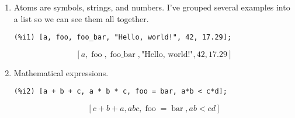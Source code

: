 \documentclass[12pt,leqno]{article}
\begin{document}
\begin{enumerate}

\item Atoms are symbols, strings, and numbers.
I've grouped several examples into a list so we can see them all together.
\begin{verbatim}
(%i1) [a, foo, foo_bar, "Hello, world!", 42, 17.29];
\end{verbatim}
\begin{dmath}[number={\(\mathop{\mathrm{\%o}_{1}}\)}]
\left[a, \mathop{\mathrm{foo}}, \mathop{\mathrm{foo\_bar}}, \mbox{"Hello, world!"}, 42, 17.29\right]
\end{dmath}

\item Mathematical expressions.
\begin{verbatim}
(%i2) [a + b + c, a * b * c, foo = bar, a*b < c*d];
\end{verbatim}
\begin{dmath}[number={\(\mathop{\mathrm{\%o}_{2}}\)}]
\left[c+b+a, a b c, \mathop{\mathrm{foo}} = \mathop{\mathrm{bar}}, a b < c d\right]
\end{dmath}



\end{enumerate}
\end{document}
